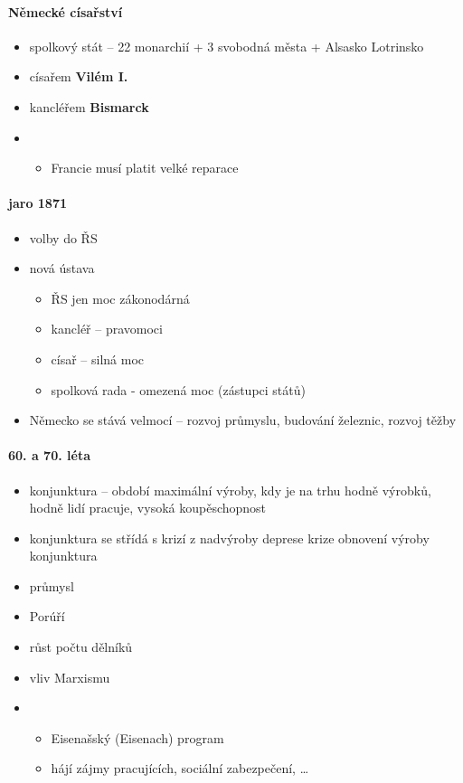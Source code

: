 \paragraph{Německé císařství}
\begin{itemize}
\item spolkový stát -- 22 monarchií + 3 svobodná města + Alsasko Lotrinsko
\item císařem \textbf{Vilém I.}
\item kancléřem \textbf{Bismarck}
\item {}
	\begin{itemize}
	\item Francie musí platit velké reparace
	\end{itemize}
\end{itemize}

\paragraph{jaro 1871}
\begin{itemize}
\item volby do ŘS
\item nová ústava
	\begin{itemize}
	\item ŘS jen moc zákonodárná
	\item kancléř -- pravomoci
	\item císař -- silná moc
	\item spolková rada - omezená moc (zástupci států)
	\end{itemize}
\item[\ra] Německo se stává velmocí -- rozvoj průmyslu, budování železnic, rozvoj těžby
\end{itemize}

\paragraph{60. a 70. léta}
\begin{itemize}
\item konjunktura -- období maximální výroby, kdy je na trhu hodně výrobků, hodně lidí pracuje, vysoká koupěschopnost
\item konjunktura se střídá s krizí z nadvýroby \ra deprese krize \ra obnovení výroby \ra konjunktura
\item průmysl
\item Porúří
\item růst počtu dělníků
\item vliv Marxismu
\item {}
	\begin{itemize}
	\item Eisenašský (Eisenach) program
	\item hájí zájmy pracujících, sociální zabezpečení, \ldots
	\end{itemize}	 
\end{itemize}

